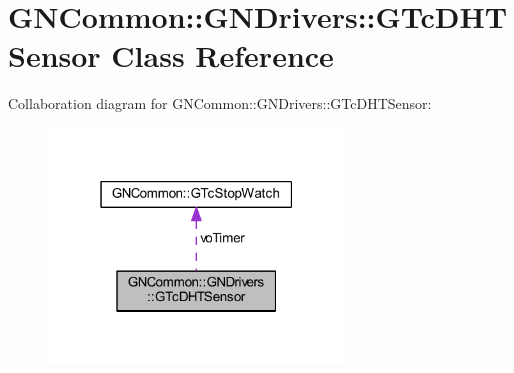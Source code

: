 \hypertarget{class_g_n_common_1_1_g_n_drivers_1_1_g_tc_d_h_t_sensor}{}\section{G\+N\+Common\+:\+:G\+N\+Drivers\+:\+:G\+Tc\+D\+H\+T\+Sensor Class Reference}
\label{class_g_n_common_1_1_g_n_drivers_1_1_g_tc_d_h_t_sensor}


Collaboration diagram for G\+N\+Common\+:\+:G\+N\+Drivers\+:\+:G\+Tc\+D\+H\+T\+Sensor\+:\nopagebreak
\begin{figure}[H]
\begin{center}
\leavevmode
\includegraphics[width=223pt]{class_g_n_common_1_1_g_n_drivers_1_1_g_tc_d_h_t_sensor__coll__graph}
\end{center}
\end{figure}
